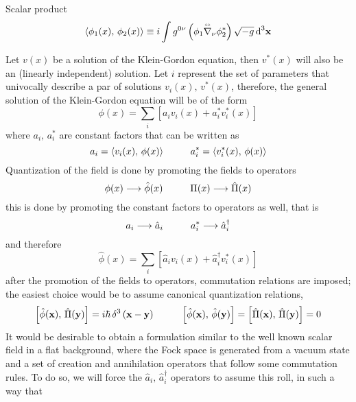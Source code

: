 Scalar product
\begin{equation}
	\langle \phi_1(x),\,\phi_2(x)\rangle\equiv i\int g^{0\nu}\left(\phi_1\overset{\text{\tiny$\leftrightarrow$}}{\nabla}_\nu\phi_2^*\right)\sqrt{-g}\,\text{d}^3\mathbf{x}
\end{equation}

Let $v(x)$ be a solution of the Klein-Gordon equation, then $v^*(x)$ will also be an (linearly independent) solution. Let $i$ represent the set of parameters that univocally describe a par of solutions $v_i(x),\,v^*(x)$, therefore, the general solution of the Klein-Gordon equation will be of the form
\begin{equation}
	\phi(x)=\sum_ i\left[a_iv_i(x)+a^*_iv^*_i(x)\right]
\end{equation} 
where $a_i,\,a^*_i$ are constant factors that can be written as
\begin{equation}
	a_i = \langle v_i(x),\,\phi(x)\rangle\hspace{1.0cm} a_i^* = \langle v_i^*(x),\,\phi(x)\rangle
\end{equation}
Quantization of the field is done by promoting the fields to operators
\begin{equation}
	\phi(x)\longrightarrow\hat{\phi}(x)\hspace{1.0cm}\Pi(x)\longrightarrow\hat{\Pi}(x)
\end{equation}
this is done by promoting the constant factors to operators as well, that is
\begin{equation}
	a_i\longrightarrow\hat{a}_i\hspace{1.0cm}a_i^*\longrightarrow\hat{a}_i^\dagger
\end{equation}
and therefore
\begin{equation}
	\hat{\phi}(x)=\sum_i\left[\hat{a}_iv_i(x)+\hat{a}_i^\dagger v^*_i(x)\right]
\end{equation}
after the promotion of the fields to operators, commutation relations are imposed; the easiest choice would be to assume canonical quantization relations,
\begin{equation}
	\left[\hat{\phi}(\mathbf{x}),\,\hat{\Pi}(\mathbf{y})\right]=i\hbar \,\delta^3\left(\mathbf{x}-\mathbf{y}\right)\hspace{1.0cm}\left[\hat{\phi}(\mathbf{x}),\,\hat{\phi}(\mathbf{y})\right]=\left[\hat{\Pi}(\mathbf{x}),\,\hat{\Pi}(\mathbf{y})\right]=0
\end{equation}
It would be desirable to obtain a formulation similar to the well known scalar field in a flat background, where the Fock space is generated from a vacuum state and a set of creation and annihilation operators that follow some commutation rules. To do so, we will force the $\hat{a}_i,\,\hat{a}^\dagger_i$ operators to assume this roll, in such a way that
